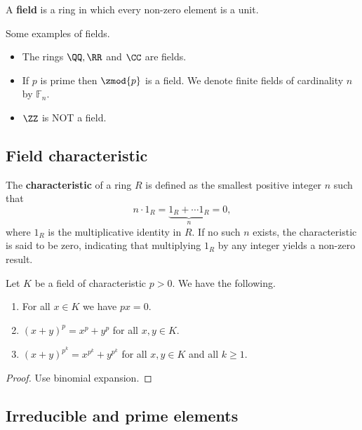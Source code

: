 \documentclass[12pt, a4paper]{article}
\begin{document}
\begin{definition}
    A \textbf{field} is a ring in which every non-zero element is a unit.
\end{definition}

\begin{mdexample}
    Some examples of fields.
    \begin{itemize}
        \item The rings \(\QQ,\RR\) and \(\CC\) are fields.
        \item If \(p\) is prime then \(\zmod{p}\) is a field. We denote finite fields of cardinality \(n\) by \(\mathbb{F}_n\).
        \item \(\ZZ\) is NOT a field.
    \end{itemize}
\end{mdexample}

\subsection{Field characteristic}

\begin{definition}
    The \textbf{characteristic} of a ring \( R \) is defined as the smallest positive integer \( n \) such that 
    \[ n \cdot 1_R = \underbrace{1_R+\cdots 1_R}_{n} = 0 ,\] 
    where \( 1_R \) is the multiplicative identity in \( R \). If no such \( n \) exists, the characteristic is said to be zero, indicating that multiplying \( 1_R \) by any integer yields a non-zero result.
\end{definition}

\begin{mdlemma}
    Let \(K\) be a field of characteristic \(p>0\). We have the following.
    \begin{enumerate}
        \item For all \(x \in K\) we have \(px=0\).
        \item \((x+y)^p = x^p+y^p\) for all \(x,y\in K\).
        \item \((x+y)^{p^k} = x^{p^k}+y^{p^k}\) for all \(x,y\in K\) and all \(k\geq 1\).
    \end{enumerate}
\end{mdlemma}

\begin{proof}
    Use binomial expansion.
\end{proof}

\subsection{Irreducible and prime elements}
\end{document}
